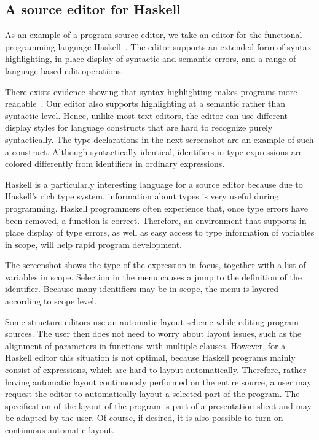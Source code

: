 %								
\subsection{A source editor for Haskell}  \label{sect:sourceeditor} 

As an example of a program source editor, we take an editor for the functional programming language Haskell~\cite{peytonJones03haskell}. The editor supports an extended form of syntax highlighting, in-place display of syntactic and semantic errors, and a range of language-based edit operations. 

There exists evidence showing that syntax-highlighting makes programs more readable~\cite{baecker88readability, omanCook90typography}. Our editor also supports highlighting at a semantic rather than syntactic level. Hence, unlike most text editors, the editor can use different display styles for language constructs that are hard to recognize purely syntactically. The type declarations in the next screenshot are an example of such a construct. Although syntactically identical, identifiers in type expressions are colored differently from identifiers in ordinary expressions.

 

Haskell is a particularly interesting language for a source editor because due to Haskell's rich type system, information about types is very useful during programming. Haskell programmers often experience that, once type errors have been removed, a function is correct. Therefore, an environment that supports in-place display of type errors, as well as easy access to type information of variables in scope, will help rapid program development. 

The screenshot shows the type of the expression in focus, together with a list of variables in scope. Selection in the menu causes a jump to the definition of the identifier. Because many identifiers may be in scope, the menu is layered according to scope level. 

%


Some structure editors use an automatic layout scheme while editing program sources. The user then does not need to worry about layout issues, such as the alignment of parameters in functions with multiple clauses. However, for a Haskell editor this situation is not optimal, because Haskell programs mainly consist of expressions, which are hard to layout automatically. Therefore, rather having automatic layout continuously performed on the entire source, a user may request the editor to automatically layout a selected part of the program. The specification of the layout of the program is part of a presentation sheet and may be adapted by the user. Of course, if desired, it is also possible to turn on continuous automatic layout.

